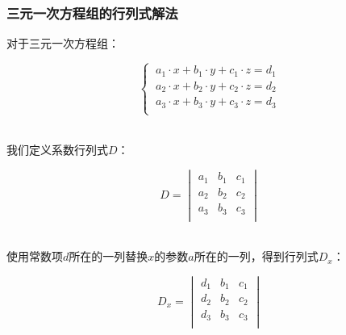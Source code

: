 \documentclass[UTF8]{ctexart}
\begin{document}
\subsubsection{三元一次方程组的行列式解法}
    对于三元一次方程组：
    \begin{large}
        \begin{equation*}
            \begin{cases}
                \ a_{1}\cdot x+b_{1}\cdot y+c_{1}\cdot z=d_{1}\\
                \ a_{2}\cdot x+b_{2}\cdot y+c_{2}\cdot z=d_{2}\\
                \ a_{3}\cdot x+b_{3}\cdot y+c_{3}\cdot z=d_{3}\\
            \end{cases}
        \end{equation*}
    \end{large}\\
    我们定义系数行列式$D$：
    \begin{large}
        \begin{equation*}
            D=
            \begin{vmatrix}
                a_1&b_1&c_1\\
                a_2&b_2&c_2\\
                a_3&b_3&c_3\\
            \end{vmatrix}
        \end{equation*}
    \end{large}\\[2mm]
    使用常数项$d$所在的一列替换$x$的参数$a$所在的一列，得到行列式$D_x$：
    \begin{large}
        \begin{equation*}
            D_x=
            \begin{vmatrix}
                d_1&b_1&c_1\\
                d_2&b_2&c_2\\
                d_3&b_3&c_3\\
            \end{vmatrix}
        \end{equation*}
    \end{large}

\newpage
\end{document}
